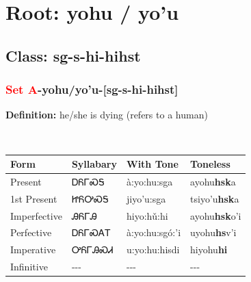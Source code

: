 \needspace{4in}
\section*{Root: yohu / yo'u}
\nopagebreak
{}
\needspace{3in}
\subsection*{Class: sg-s-hi-hihst}
\nopagebreak
\needspace{2in}
\subsubsection*{\textcolor{Red}{Set A}{-}\textbf{yohu/yo'u}{-}[sg-s-hi-hihst]}
\nopagebreak
\textbf{Definition: } he/she is dying (refers to a human)
\\[0.5em]
\begin{tabularx}{\textwidth}{l X X X}%
\toprule%
\textbf{Form}&\textbf{Syllabary}&\textbf{With Tone}&\textbf{Toneless}\\%
\midrule%
Present&ᎠᏲᎱᏍᎦ&à:yo:hu:sga&ayohu\textbf{hsk}a\\%
1st Present&ᏥᏲᎤᏍᎦ&jiyo’u:sga&tsiyo'u\textbf{hsk}a\\%
Imperfective&ᎯᏲᎱᎯ&hiyo:hǔ:hi&ayohu\textbf{hsk}o'i\\%
Perfective&ᎠᏲᎱᏍᎪᎢ&à:yo:hu:sgó:’i&uyohu\textbf{hs}v'i\\%
Imperative&ᎤᏲᎱᎯᏍᏗ&u:yo:hu:hisdi&hiyohu\textbf{hi}\\%
Infinitive&{-}{-}{-}&{-}{-}{-}&{-}{-}{-}\\%
\bottomrule%
\end{tabularx}
\\[1em]